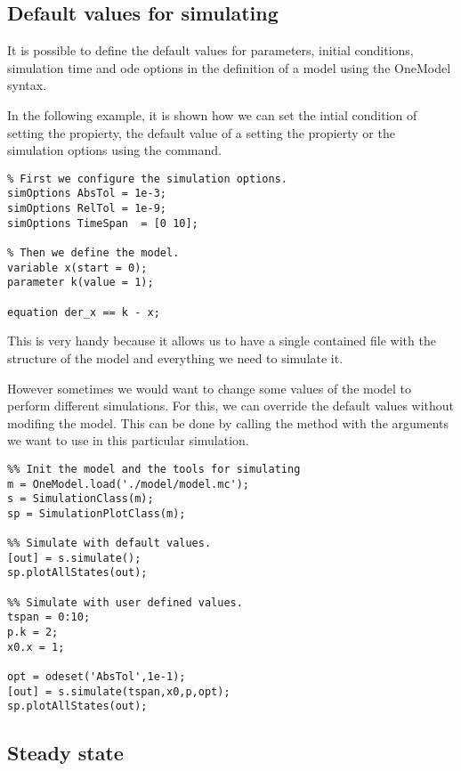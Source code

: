 \documentclass[11pt]{article}
\begin{document}
\subsection{Default values for simulating}

It is possible to define the default values for parameters, initial conditions, simulation time and ode options in the definition of a model using the OneModel syntax.

In the following example, it is shown how we can set the intial condition of  setting the  propierty, the default value of a  setting the  propierty or the simulation options using the  command.

\begin{lstlisting}
% First we configure the simulation options.
simOptions AbsTol = 1e-3;
simOptions RelTol = 1e-9;
simOptions TimeSpan  = [0 10];

% Then we define the model.
variable x(start = 0);
parameter k(value = 1);

equation der_x == k - x;
\end{lstlisting}

This is very handy because it allows us to have a single contained file with the structure of the model and everything we need to simulate it.

However sometimes we would want to change some values of the model to perform different simulations.
For this, we can override the default values without modifing the model. This can be done by calling the  method with the arguments we want to use in this particular simulation.

\begin{lstlisting}
%% Init the model and the tools for simulating
m = OneModel.load('./model/model.mc');
s = SimulationClass(m);
sp = SimulationPlotClass(m);

%% Simulate with default values.
[out] = s.simulate();
sp.plotAllStates(out);

%% Simulate with user defined values.
tspan = 0:10;
p.k = 2;
x0.x = 1;

opt = odeset('AbsTol',1e-1);
[out] = s.simulate(tspan,x0,p,opt);
sp.plotAllStates(out);
\end{lstlisting}

\subsection{Steady state}
\end{document}
